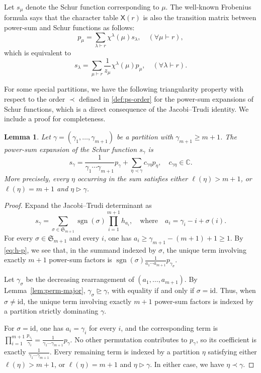 \documentclass[11pt]{amsart}
\numberwithin{equation}{section}
\theoremstyle{plain}
\newtheorem{lem}[thm]{Lemma}
\theoremstyle{definition}
\theoremstyle{remark}
\begin{document}
Let $s_\mu$ denote the Schur function corresponding to $\mu$. 
The well-known Frobenius formula \cite[Chapter~I, (7.8)]{Mac95} says that the character table 
$\mathsf{X}(r)$ is also the transition matrix between power-sum and Schur functions as follows:
\begin{equation}\label{eq:frob}
p_\mu=\sum_{\lambda\vdash r}\chi^\lambda(\mu)s_\lambda,\quad(\forall \mu\vdash r),
\end{equation}
which is equivalent to 
$$s_\lambda=\sum_{\mu\vdash r}\frac{1}{z_\mu}\chi^\lambda(\mu)p_\mu, \quad(\forall \lambda\vdash r).$$

For some special partitions, we have the following triangularity property with respect to the order $\prec$ defined in \eqref{def:ps-order} for the power-sum expansions of Schur functions, which is a direct consequence of the Jacobi–Trudi identity. We include a proof for completeness.

\begin{lem}\label{lem:JT-leading}
Let
$\gamma=(\gamma_1,\ldots,\gamma_{m+1})$ be a partition with
$\gamma_{m+1}\geq m+1$. 
The power-sum expansion of the Schur function $s_\gamma$ is
\begin{equation}\label{eq:specials-p}
s_\gamma
=
\frac{1}{\gamma_1\cdots\gamma_{m+1}}p_\gamma
+
\sum_{\eta\prec\gamma}
c_{\gamma\eta}p_\eta,
\quad
c_{\gamma\eta}\in\mathbb C.
\end{equation}
More precisely, every $\eta$ occurring in the sum satisfies either
$\ell(\eta)>m+1$, or
$\ell(\eta)=m+1$ and $\eta\triangleright\gamma$.
\end{lem}

\begin{proof}
Expand the Jacobi--Trudi determinant \cite[Chapter~I, (3.4)]{Mac95} as
$$
s_\gamma
=
\sum_{\sigma\in\mathfrak S_{m+1}}
\operatorname{sgn}(\sigma)
\prod_{i=1}^{m+1} h_{a_i},
\quad \text{where}\quad
a_i=\gamma_i-i+\sigma(i).
$$
For every $\sigma\in\mathfrak S_{m+1}$ and every $i$, one has
$a_i\geq\gamma_{m+1}-(m+1)+1\geq1$.
%
By \eqref{eq:h-p}, we see that, in the summand indexed by $\sigma$, the unique term
involving exactly $m+1$ power-sum factors is $\operatorname{sgn}(\sigma)
\frac{1}{a_1\cdots a_{m+1}}p_{\gamma_\sigma}$.

Let $\gamma_\sigma$ be the decreasing rearrangement of $(a_1,\ldots,a_{m+1})$.
By Lemma~\ref{lem:perm-major},
$\gamma_\sigma\unrhd\gamma$, with equality if and only if
$\sigma=\mathrm{id}$. Thus, when $\sigma\neq\mathrm{id}$, the
unique term involving exactly $m+1$ power-sum factors is indexed
by a partition strictly dominating $\gamma$.

For $\sigma=\mathrm{id}$, one has $a_i=\gamma_i$ for every $i$,
and the corresponding term is
$\prod_{i=1}^{m+1}\frac{p_{\gamma_i}}{\gamma_i}
=
\frac{1}{\gamma_1\cdots\gamma_{m+1}}p_\gamma$.
No other permutation contributes to $p_\gamma$, so its coefficient
is exactly $\frac{1}{\gamma_1\cdots\gamma_{m+1}}$. Every remaining
term is indexed by a partition $\eta$ satisfying either
$\ell(\eta)>m+1$, or
$\ell(\eta)=m+1$ and $\eta\triangleright\gamma$. In either case, we have $\eta\prec\gamma$.
\end{proof}
\end{document}

